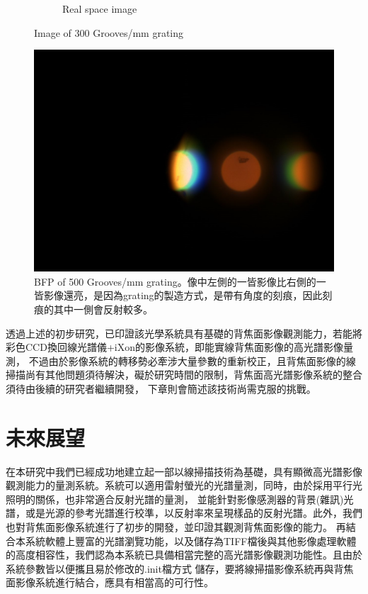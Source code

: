 \documentclass[12pt]{article}
\begin{document}
\begin{figure}[h]
\begin{subfigure}[b]{0.45\textwidth}
        \caption{Real space image}
        \label{fig: 300 real}
    \end{subfigure}
    \caption{Image of 300 Grooves/mm grating}
\end{figure}

\begin{figure}[h]
    \centering
    \includegraphics[width = 0.8\linewidth]{500bfp.jpeg}
    \caption[BFP of 500 Grooves/mm grating]{BFP of 500 Grooves/mm grating。像中左側的一皆影像比右側的一皆影像還亮，是因為grating的製造方式，是帶有角度的刻痕，因此刻痕的其中一側會反射較多。}
    \label{fig: 500 bfp}
\end{figure}

透過上述的初步研究，已印證該光學系統具有基礎的背焦面影像觀測能力，若能將彩色CCD換回線光譜儀+iXon的影像系統，即能實線背焦面影像的高光譜影像量測，
不過由於影像系統的轉移勢必牽涉大量參數的重新校正，且背焦面影像的線掃描尚有其他問題須待解決，礙於研究時間的限制，背焦面高光譜影像系統的整合須待由後續的研究者繼續開發，
下章則會簡述該技術尚需克服的挑戰。

\section{未來展望}
在本研究中我們已經成功地建立起一部以線掃描技術為基礎，具有顯微高光譜影像觀測能力的量測系統。系統可以適用雷射螢光的光譜量測，同時，由於採用平行光照明的關係，也非常適合反射光譜的量測，
並能針對影像感測器的背景(雜訊)光譜，或是光源的參考光譜進行校準，以反射率來呈現樣品的反射光譜。此外，我們也對背焦面影像系統進行了初步的開發，並印證其觀測背焦面影像的能力。
再結合本系統軟體上豐富的光譜瀏覽功能，以及儲存為TIFF檔後與其他影像處理軟體的高度相容性，我們認為本系統已具備相當完整的高光譜影像觀測功能性。且由於系統參數皆以便攜且易於修改的.init檔方式
儲存，要將線掃描影像系統再與背焦面影像系統進行結合，應具有相當高的可行性。
\end{document}
